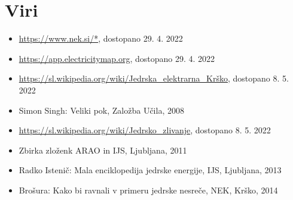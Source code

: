 \documentclass[a4paper,12pt]{article}
\begin{document}
\section{Viri}
\begin{itemize}
	\item \href{https://www.nek.si/}{https://www.nek.si/*}, dostopano 29. 4. 2022
    \item \href{https://app.electricitymap.org}{https://app.electricitymap.org}, dostopano 29. 4. 2022
    \item \href{https://sl.wikipedia.org/wiki/Jedrska\_elektrarna\_Krško}{https://sl.wikipedia.org/wiki/Jedrska\_elektrarna\_Krško}, dostopano 8. 5. 2022
    \item Simon Singh: Veliki pok, Založba Učila, 2008
    \item \href{https://sl.wikipedia.org/wiki/Jedrsko\_zlivanje}{https://sl.wikipedia.org/wiki/Jedrsko\_zlivanje}, dostopano 8. 5. 2022
    \item Zbirka zloženk ARAO in IJS, Ljubljana, 2011 
    \item Radko Istenič: Mala enciklopedija jedrske energije, IJS, Ljubljana, 2013 
    \item Brošura: Kako bi ravnali v primeru jedrske nesreče, NEK, Krško, 2014
\end{itemize}
\end{document}
